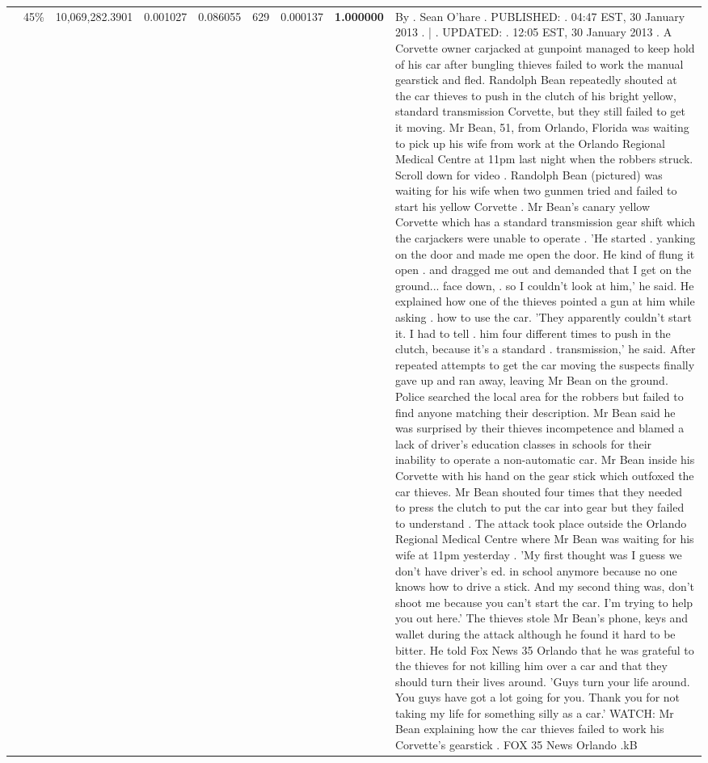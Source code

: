 \begin{table}[H]
\begin{tabular}{llrrrrrrl}
 & 45\% & 10,069,282.3901 & 0.001027 & 0.086055 & \color{red} 629 & 0.000137 & \bfseries \color{red} 1.000000 & By . Sean O'hare . PUBLISHED: . 04:47 EST, 30 January 2013 . | . UPDATED: . 12:05 EST, 30 January 2013 . A Corvette owner carjacked at gunpoint managed to keep hold of his car after bungling thieves failed to work the manual gearstick and fled. Randolph Bean repeatedly shouted at the car thieves to push in the clutch of his bright yellow, standard transmission Corvette, but they still failed to get it moving. Mr Bean, 51, from Orlando, Florida was waiting to pick up his wife from work at the Orlando Regional Medical Centre at 11pm last night when the robbers struck. Scroll down for video . Randolph Bean (pictured) was waiting for his wife when two gunmen tried and failed to start his yellow Corvette . Mr Bean's canary yellow Corvette which has a standard transmission gear shift which the carjackers were unable to operate . 'He started . yanking on the door and made me open the door. He kind of flung it open . and dragged me out and demanded that I get on the ground... face down, . so I couldn't look at him,' he said. He explained how one of the thieves pointed a gun at him while asking . how to use the car. 'They apparently couldn't start it. I had to tell . him four different times to push in the clutch, because it's a standard . transmission,' he said. After repeated attempts to get the car moving the suspects finally gave up and ran away, leaving Mr Bean on the ground. Police searched the local area for the robbers but failed to find anyone matching their description. Mr Bean said he was surprised by their thieves incompetence and blamed a lack of driver's education classes in schools for their inability to operate a non-automatic car. Mr Bean inside his Corvette with his hand on the gear stick which outfoxed the car thieves. Mr Bean shouted four times that they needed to press the clutch to put the car into gear but they failed to understand . The attack took place outside the Orlando Regional Medical Centre where Mr Bean was waiting for his wife at 11pm yesterday . 'My first thought was I guess we don't have driver's ed. in school anymore because no one knows how to drive a stick. And my second thing was, don't shoot me because you can't start the car. I'm trying to help you out here.' The thieves stole Mr Bean's phone, keys and wallet during the attack although he found it hard to be bitter. He told Fox News 35 Orlando that he was grateful to the thieves for not killing him over a car and that they should turn their lives around. 'Guys turn your life around. You guys have got a lot going for you. Thank you for not taking my life for something silly as a car.' WATCH: Mr Bean explaining how the car thieves failed to work his Corvette's gearstick . FOX 35 News Orlando .kB \\

\end{tabular}
\end{table}

